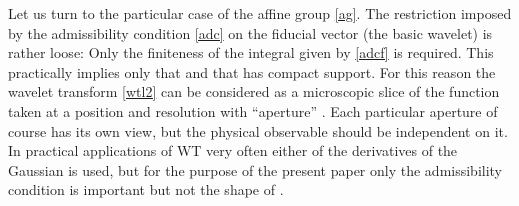 \documentclass[a4paper,a4paper]{article}
\begin{document}
Let us turn to the particular case of the affine group \eqref{ag}. 
The restriction imposed by the admissibility condition \eqref{adc} on 
the fiducial vector \myHighlight{$\psi$}\coordHE{} (the basic wavelet) is rather loose: 
Only the finiteness of the integral \coordHE{} given by \eqref{adcf} is 
required.  
This practically implies only that \coordHE{} and that 
\coordHE{} has compact support. For this reason the wavelet transform 
\eqref{wtl2}
can be considered as a microscopic slice of the function \coordHE{} taken 
at a position \coordHE{} and resolution \coordHE{} with ``aperture'' \myHighlight{$\psi$}\coordHE{}. Each 
particular aperture \coordHE{} of course has its own view, but the physical 
observable should be independent on it. In practical applications of 
WT very often either of the derivatives of the Gaussian 
\coordHE{} is used, but for the purpose of 
the present paper only the admissibility condition is important but not 
the shape of \coordHE{}. 
\end{document}
